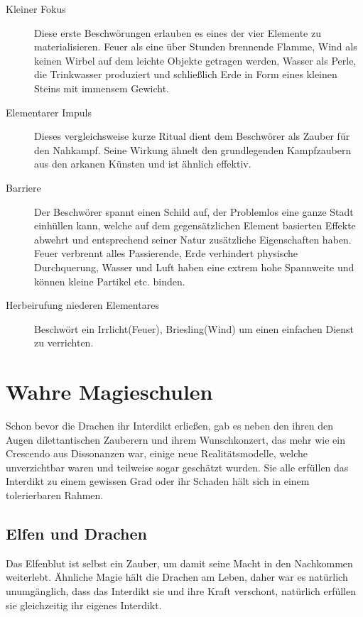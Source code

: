 \documentclass[a4paper,12pt,oneside]{book}
\begin{document}
\begin{description}
\item[Kleiner Fokus]Diese erste Beschwörungen erlauben es eines der vier Elemente zu materialisieren. Feuer als eine über Stunden brennende Flamme, Wind als keinen Wirbel auf dem leichte Objekte getragen werden, Wasser als Perle, die Trinkwasser produziert und schließlich Erde in Form eines kleinen Steins mit immensem Gewicht.
\item[Elementarer Impuls]Dieses vergleichsweise kurze Ritual dient dem Beschwörer als Zauber für den Nahkampf. Seine Wirkung ähnelt den grundlegenden Kampfzaubern aus den arkanen Künsten und ist ähnlich effektiv.
\item[Barriere]Der Beschwörer spannt einen Schild auf, der Problemlos eine ganze Stadt einhüllen kann, welche auf dem gegensätzlichen Element basierten Effekte abwehrt und entsprechend seiner Natur zusätzliche Eigenschaften haben. Feuer verbrennt alles Passierende, Erde verhindert physische Durchquerung, Wasser und Luft haben eine extrem hohe Spannweite und können kleine Partikel etc. binden.
\item[Herbeirufung niederen Elementares]Beschwört ein Irrlicht(Feuer), Briesling(Wind) um einen einfachen Dienst zu verrichten.
\end{description}


\chapter{Wahre Magieschulen}
Schon bevor die Drachen ihr Interdikt erließen, gab es neben den ihren den Augen dilettantischen Zauberern und ihrem Wunschkonzert, das mehr wie ein Crescendo aus Dissonanzen war, einige neue Realitätsmodelle, welche unverzichtbar waren und teilweise sogar geschätzt wurden. Sie alle erfüllen das Interdikt zu einem gewissen Grad oder ihr Schaden hält sich in einem tolerierbaren Rahmen.

\section{Elfen und Drachen}
Das Elfenblut ist selbst ein Zauber, um damit seine Macht in den Nachkommen weiterlebt. Ähnliche Magie hält die Drachen am Leben, daher war es natürlich unumgänglich, dass das Interdikt sie und ihre Kraft verschont, natürlich erfüllen sie gleichzeitig ihr eigenes Interdikt.
\end{document}
